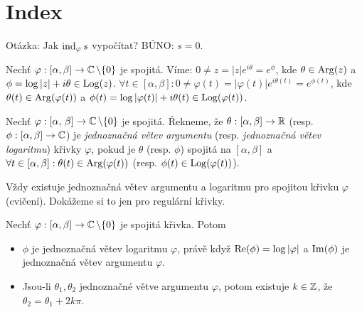 \section{Index}

\begin{note}
Otázka: Jak $\operatorname{ind}_\varphi s$ vypočítat? BÚNO: $s=0$.
\end{note}

\begin{notation}
Nechť $\varphi: [\alpha, \beta] \rightarrow \operatorname{\mathbb{C}}  \setminus \{0\}$ je spojitá. Víme: $0 \neq z = |z|e^{i \theta}=e^{\phi}$, kde $\theta \in \operatorname*{Arg}(z)$ a $\phi = \log|z| + i \theta \in \operatorname*{Log}(z)$. $\forall t \in [\alpha, \beta]: 0 \neq \varphi(t)=|\varphi(t)|e^{i \theta(t)}=e^{ \phi(t)}$, kde $\theta(t) \in \operatorname*{Arg}(\varphi(t))$ a $\phi(t)=\log|\varphi(t)|+i \theta(t) \in \operatorname*{Log}(\varphi(t))$.
\end{notation}

\begin{definition}
Nechť $\varphi: [\alpha,\,\beta] \rightarrow \operatorname{\mathbb{C}}  \setminus \{0\}$ je spojitá. Řekneme, že $\theta: [\alpha, \beta] \rightarrow \operatorname{\mathbb{R}}$ (resp. $\phi: [\alpha, \beta] \rightarrow \operatorname{\mathbb{C}} $) je \emph{jednoznačná větev argumentu} (resp. \emph{jednoznačná větev logaritmu}) křivky $\varphi$, pokud je $\theta$ (resp. $\phi$) spojitá na $[\alpha, \beta]$ a $\forall t \in [\alpha, \beta]:  \theta(t) \in \operatorname*{Arg}(\varphi(t))$ (resp. $\phi(t) \in \operatorname*{Log}(\varphi(t))$).
\end{definition}

\begin{note}
Vždy existuje jednoznačná větev argumentu a logaritmu pro spojitou křivku $\varphi$ (cvičení). Dokážeme si to jen pro regulární křivky.
\end{note}

\begin{theorem}
Nechť $\varphi: [\alpha, \beta] \rightarrow \operatorname{\mathbb{C}}  \setminus \{0\}$ je spojitá křivka. Potom
\begin{itemize}
    \item $\phi$ je jednoznačná větev logaritmu $\varphi$, právě když $\operatorname{Re}(\phi) = \log|\varphi|$ a $\operatorname{Im}(\phi)$ je jednoznačná větev argumentu $\varphi$.
    \item Jsou-li $\theta_1, \theta_2$ jednoznačné větve argumentu $\varphi$, potom existuje $k \in \operatorname{\mathbb{Z}}$, že $\theta_2=\theta_1 + 2 k \pi $.
\end{itemize}
\end{theorem}

